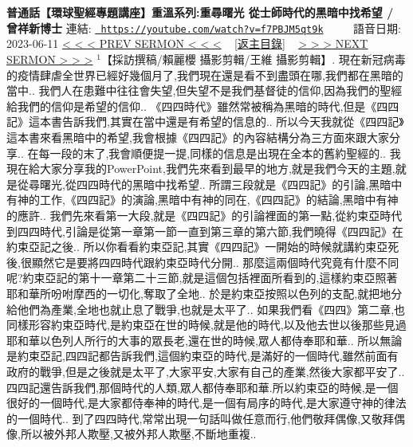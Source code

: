 \documentclass{book}
\begin{document}
\section{}
\label{sec:f7PBJM5qt9k}
\textbf{普通話【環球聖經專題講座】重溫系列:重尋曙光 從士師時代的黑暗中找希望 / 曾祥新博士}
\newline
\newline
連結: \href{https://youtube.com/watch?v=f7PBJM5qt9k}{\texttt{ https://youtube.com/watch?v=f7PBJM5qt9k}} ~~~~ 語音日期: 2023-06-11 
\newline
\newline
\hyperref[sec:RIiOFAsko5U]{\small{< < < PREV SERMON < < <}}
~
\hyperref[sec:index]{\small{[返主目錄]}}
~
\hyperref[sec:QJ5_Q_62J64]{\small{> > > NEXT SERMON > > >}}
\newline
\newline
$^{1}$【採訪撰稿/賴麗櫻 攝影剪輯/王維 攝影剪輯】.
現在新冠病毒的疫情肆虐全世界已經好幾個月了,我們現在還是看不到盡頭在哪,我們都在黑暗的當中..
我們人在患難中往往會失望,但失望不是我們基督徒的信仰,因為我們的聖經給我們的信仰是希望的信仰..
《四四時代》雖然常被稱為黑暗的時代,但是《四四記》這本書告訴我們,其實在當中還是有希望的信息的..
所以今天我就從《四四記》這本書來看黑暗中的希望,我會根據《四四記》的內容結構分為三方面來跟大家分享..
在每一段的末了,我會順便提一提,同樣的信息是出現在全本的舊約聖經的..
我現在給大家分享我的PowerPoint,我們先來看到最早的地方,就是我們今天的主題,就是從尋曙光,從四四時代的黑暗中找希望..
所謂三段就是《四四記》的引論,黑暗中有神的工作,《四四記》的演論,黑暗中有神的同在,《四四記》的結論,黑暗中有神的應許..
我們先來看第一大段,就是《四四記》的引論裡面的第一點,從約束亞時代到四四時代,引論是從第一章第一節一直到第三章的第六節,我們曉得《四四記》在約束亞記之後..
所以你看看約束亞記,其實《四四記》一開始的時候就講約束亞死後,很顯然它是要將四四時代跟約束亞時代分開..
那麼這兩個時代究竟有什麼不同呢?約束亞記的第十一章第二十三節,就是這個包括裡面所看到的,這樣約束亞照著耶和華所吩咐摩西的一切化,奪取了全地..
於是約束亞按照以色列的支配,就把地分給他們為產業,全地也就止息了戰爭,也就是太平了..
如果我們看《四四》第二章,也同樣形容約束亞時代,是約束亞在世的時候,就是他的時代,以及他去世以後那些見過耶和華以色列人所行的大事的眾長老,還在世的時候,眾人都侍奉耶和華..
所以無論是約束亞記,四四記都告訴我們,這個約束亞的時代,是滿好的一個時代,雖然前面有政府的戰爭,但是之後就是太平了,大家平安,大家有自己的產業,然後大家都平安了..
四四記還告訴我們,那個時代的人類,眾人都侍奉耶和華.所以約束亞的時候,是一個很好的一個時代,是大家都侍奉神的時代,是一個有局序的時代,是大家遵守神的律法的一個時代..
到了四四時代,常常出現一句話叫做任意而行,他們敬拜偶像,又敬拜偶像,所以被外邦人欺壓,又被外邦人欺壓,不斷地重複..
\end{document}
